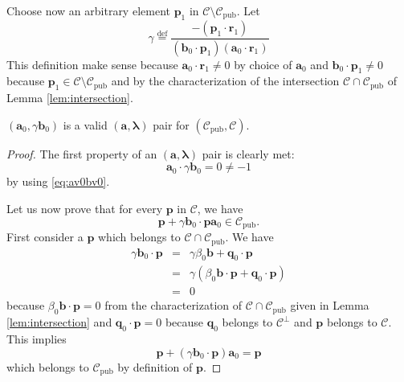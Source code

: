 \documentclass[runningheads,11pt]{llncs}
\newcommand{\eqdef}{\stackrel{\text{def}}{=}}
\newcommand{\code}[1]{\ensuremath{\mathscr{#1}}}
\newcommand{\Cpub}{\code{C}_{\text{pub}}}
\newcommand{\CC}{\code{C}}
\newcommand{\scp}[2]{#1\cdot #2}
\newcommand{\word}[1]{\ensuremath{\boldsymbol{#1}}}
\newcommand{\av}{\word{a}}
\newcommand{\bv}{\word{b}}
\newcommand{\lambdav}{\word{\lambda}}
\newcommand{\pv}{\word{p}}
\newcommand{\qv}{\word{q}}
\newcommand{\rv}{\word{r}}
\begin{document}
Choose now an arbitrary element $\pv_1$ in $\CC \setminus \Cpub$. Let 
\begin{equation}
\label{eq:gamma}
\gamma \eqdef \frac{- (\scp{\pv_1}{\rv_1})}{(\scp{\bv_0}{\pv_1})(\scp{\av_0}{\rv_1})}
\end{equation}
This definition make sense because $\scp{\av_0}{\rv_1}\neq 0$ by choice of $\av_0$ and
$\scp{\bv_0}{\pv_1}\neq 0$ because $\pv_1 \in \CC\setminus \Cpub$ and by the characterization of
the intersection $\CC\cap \Cpub$ of Lemma \ref{lem:intersection}.
\begin{proposition}
\label{prop:attack_Baldi}
$(\av_0,\gamma \bv_0)$ is a valid $(\av,\lambdav)$ pair for $(\Cpub,\CC)$.
\end{proposition}

\begin{proof}
The first property of an $(\av,\lambdav)$ pair is clearly met:
$$
\scp{\av_0}{\gamma \bv_0} = 0 \neq -1
$$
by using \eqref{eq:av0bv0}.

Let us now prove that for every $\pv$ in $\CC$, we have
$$
\pv + \scp{\gamma \bv_0}{\pv} \av_0 \in \Cpub.
$$
First consider a $\pv$ which belongs to $\CC \cap \Cpub$. We have
\begin{eqnarray*}
\scp{\gamma \bv_0}{\pv} & = & \gamma \scp{\beta_0 \bv + \qv_0 }{\pv}\\
& = & \gamma\left(  \scp{\beta_0 \bv }{\pv} +  \scp{ \qv_0 }{\pv}\right)\\
&= &0
\end{eqnarray*}
because $\scp{\beta_0 \bv }{\pv}=0$ from the characterization of $\CC \cap \Cpub$ given in Lemma
\ref{lem:intersection} and $\scp{ \qv_0 }{\pv}=0$ because $\qv_0$ belongs to $\CC^\perp$ and 
$\pv$ belongs to $\CC$. This implies
$$
\pv + (\scp{\gamma \bv_0}{\pv})\av_0 = \pv
$$
which belongs to $\Cpub$ by definition of $\pv$.


\end{proof}
\end{document}
